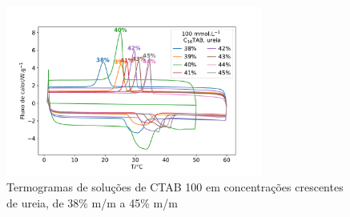 %
		
		\begin{figure}[h]
			\centering
			\includegraphics[width=0.75\textwidth]{./imagens/dsc/CTAB_porc_ur}
			\caption{Termogramas de soluções de CTAB 100 \mM{} em concentrações crescentes de ureia, de 38\% m/m a 45\% m/m}
			\label{fig:DSC_CTAB_UR38-45}
		\end{figure}
		
